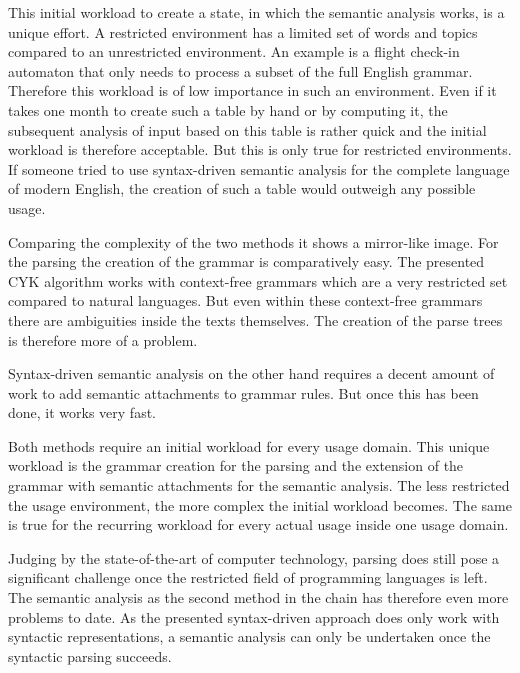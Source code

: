 \documentclass[12pt,twoside]{scrartcl}
\theoremstyle{plain}
\theoremstyle{definition}
\theoremstyle{remark}
\begin{document}
	This initial workload to create a state, in which the semantic analysis works, is a unique effort.\cite{Jurafsky2009} A restricted environment has a limited set of words and topics compared to an unrestricted environment. An example is a flight check-in automaton that only needs to process a subset of the full English grammar. Therefore this workload is of low importance in such an environment. Even if it takes one month to create such a table by hand or by computing it, the subsequent analysis of input based on this table is rather quick and the initial workload is therefore acceptable. But this is only true for restricted environments. If someone tried to use syntax-driven semantic analysis for the complete language of modern English, the creation of such a table would outweigh any possible usage.
	
	
	Comparing the complexity of the two methods it shows a mirror-like image. For the parsing the creation of the grammar is comparatively easy. The presented CYK algorithm works with context-free grammars which are a very restricted set compared to natural languages. But even within these context-free grammars there are ambiguities inside the texts themselves. The creation of the parse trees is therefore more of a problem.
	
	Syntax-driven semantic analysis on the other hand requires a decent amount of work to add semantic attachments to grammar rules.\cite{Jurafsky2009} But once this has been done, it works very fast.
	
	Both methods require an initial workload for every usage domain. This unique workload is the grammar creation for the parsing and the extension of the grammar with semantic attachments for the semantic analysis. The less restricted the usage environment, the more complex the initial workload becomes. The same is true for the recurring workload for every actual usage inside one usage domain.
	
	Judging by the state-of-the-art of computer technology, parsing does still pose a significant challenge once the restricted field of programming languages is left. The semantic analysis as the second method in the chain has therefore even more problems to date. As the presented syntax-driven approach does only work with syntactic representations\cite{Jurafsky2009}, a semantic analysis can only be undertaken once the syntactic parsing succeeds.
	
\end{document}
